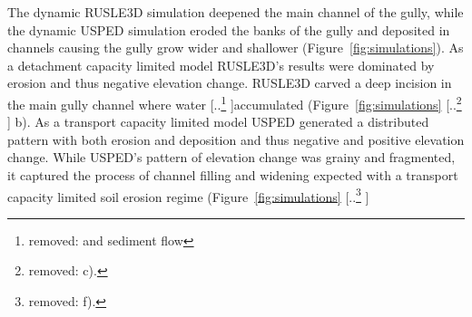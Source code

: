 \documentclass[gmd, manuscript]{copernicus}
\providecommand{\DIFadd}[1]{{\protect\color{blue} \sf #1}} %
\providecommand{\DIFdel}[1]{{\protect\color{red} [..\footnote{removed: #1} ]}} %
\providecommand{\DIFaddbegin}{} %
\providecommand{\DIFaddend}{} %
\providecommand{\DIFdelbegin}{} %
\providecommand{\DIFdelend}{} %
\providecommand{\DIFaddFL}[1]{\DIFadd{#1}} %
\begin{document}
\begin{table}
\small
\caption{\DIFaddFL{Linear regression of elevation maps for drainage area}}
\label{table:linear_regression} 
\end{table}




\DIFaddend The dynamic RUSLE3D simulation
deepened the main channel of the gully,
while the dynamic USPED simulation
eroded the banks of the gully
and deposited in channels
causing the gully grow wider and shallower
(Figure~\ref{fig:simulations}). 
As a detachment capacity limited model
RUSLE3D's results were
dominated by erosion and 
thus negative elevation change.
RUSLE3D carved a deep incision 
in the main gully channel
where water \DIFdelbegin \DIFdel{and sediment flow }\DIFdelend accumulated
(Figure~\ref{fig:simulations}\DIFdelbegin \DIFdel{c). 
}\DIFdelend \DIFaddbegin \DIFadd{b). 
}\DIFaddend As a transport capacity limited model
USPED generated a distributed pattern
with both erosion and deposition and thus
negative and positive elevation change.
While USPED's pattern of elevation change
was grainy and fragmented, 
it captured the process of channel 
filling and widening expected with 
a transport capacity limited soil erosion regime
(Figure~\ref{fig:simulations}\DIFdelbegin \DIFdel{f). 
}%
\end{document}
